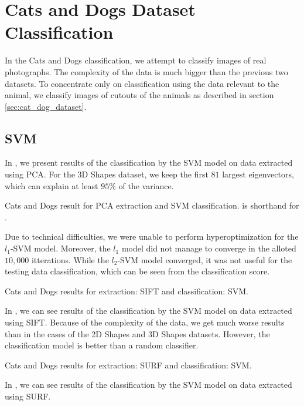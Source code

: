 \section{Cats and Dogs Dataset Classification}
In the Cats and Dogs classification, we attempt to classify images of real photographs. The complexity of the data is much bigger than the previous two datasets. To concentrate only on classification using the data relevant to the animal, we classify images of cutouts of the animals as described in section \ref{sec:cat_dog_dataset}.

\subsection{SVM}
In , we present results of the classification by the SVM model on data extracted using PCA. For the 3D Shapes dataset, we keep the first $81$ largest eigenvectors, which can explain at least $95\%$ of the variance.
\begin{table}[ht!]
    \centering
    
    \caption[Cats and Dogs result for PCA extraction and SVM classification]{Cats and Dogs result for PCA extraction and SVM classification.  is shorthand for .}
    \label{tab:iiit_PCA_SVM}
\end{table}

Due to technical difficulties, we were unable to perform hyperoptimization for the $l_1$-SVM model. Moreover, the $l_1$ model did not manage to converge in the alloted $10,000$ itterations. While the $l_2$-SVM model converged, it was not useful for the testing data classification, which can be seen from the classification score.

\begin{table}[ht!]
    \centering
    
    \caption[Cats and Dogs results for extraction: SIFT and classification: SVM]{Cats and Dogs results for extraction: SIFT and classification: SVM.}
    \label{tab:iiit_SIFT_SVM}
\end{table}
In , we can see results of the classification by the SVM model on data extracted using SIFT. Because of the complexity of the data, we get much worse results than in the cases of the 2D Shapes and 3D Shapes datasets. However, the classification model is better than a random classifier.

\begin{table}[ht!]
    \centering
    
    \caption[Cats and Dogs results for extraction: SURF and classification: SVM]{Cats and Dogs results for extraction: SURF and classification: SVM.}
    \label{tab:iiit_SURF_SVM}
\end{table}
In , we can see results of the classification by the SVM model on data extracted using SURF.

